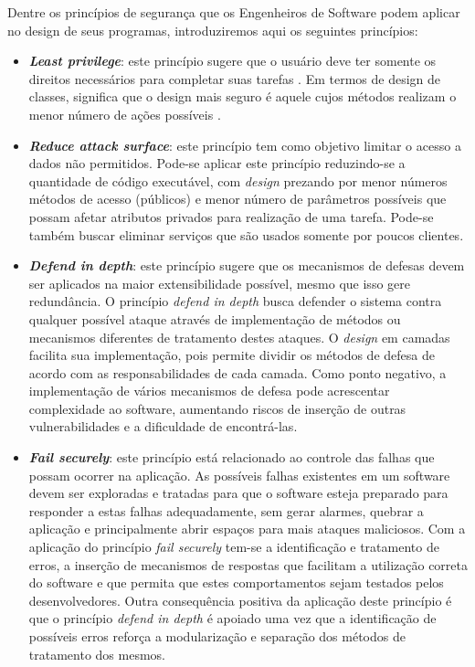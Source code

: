 %

Dentre os princípios de segurança que os Engenheiros de Software podem aplicar no design de seus programas, introduziremos aqui os seguintes princípios:

\begin{itemize}
\item \textbf{\emph{Least privilege}}: este princípio sugere que o usuário deve ter somente os direitos necessários para completar suas tarefas \cite{bishop2003}. Em termos de design de classes, significa que o design mais seguro é aquele cujos métodos realizam o menor número de ações possíveis \cite{a1lshammari2009}.

\item \textbf{\emph{Reduce attack surface}}: este princípio tem como objetivo limitar o acesso a dados não permitidos. Pode-se aplicar este princípio reduzindo-se a quantidade de código executável, com \emph{design} prezando por menor números métodos de acesso (públicos) e menor número de parâmetros possíveis que possam afetar atributos privados para realização de uma tarefa. Pode-se também buscar eliminar serviços que são usados somente por poucos clientes.

\item \textbf{\emph{Defend in depth}}: este princípio sugere que os mecanismos de defesas devem ser aplicados na maior extensibilidade possível, mesmo que isso gere redundância. O princípio \emph{defend in depth} busca defender o sistema contra qualquer possível ataque através de implementação de métodos ou mecanismos diferentes de tratamento destes ataques. O \emph{design} em camadas facilita sua implementação, pois permite dividir os métodos de defesa de acordo com as responsabilidades de cada camada. Como ponto negativo, a implementação de vários mecanismos de defesa pode acrescentar complexidade ao software, aumentando riscos de inserção de outras vulnerabilidades e a dificuldade de encontrá-las.

\item \textbf{\emph{Fail securely}}: este princípio está relacionado ao controle das falhas que possam ocorrer na aplicação. As possíveis falhas existentes em um software devem ser exploradas e tratadas para que o software esteja preparado para responder a estas falhas adequadamente, sem gerar alarmes, quebrar a aplicação e principalmente abrir espaços para mais ataques maliciosos. Com a aplicação do princípio \emph{fail securely} tem-se a identificação e tratamento de erros, a inserção de mecanismos de respostas que facilitam a utilização correta do software e que permita que estes comportamentos sejam testados pelos desenvolvedores. Outra consequência positiva da aplicação deste princípio é que o princípio \emph{defend in depth} é apoiado uma vez que a identificação de possíveis erros reforça a modularização e separação dos métodos de tratamento dos mesmos.


\end{itemize}
